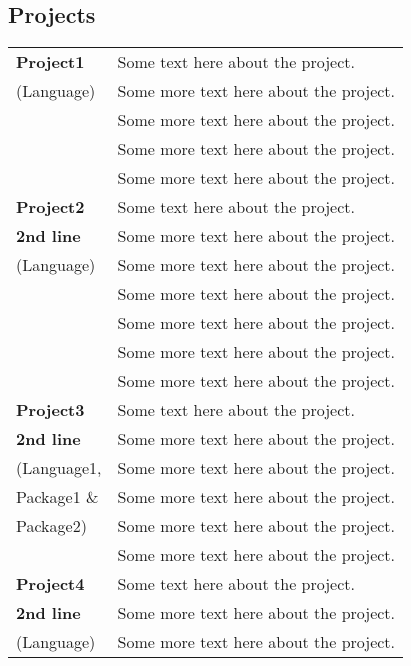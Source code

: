 \documentclass[11pt]{article}
\begin{document}
\begin{multicols}{2}
{{\begin{minipage}[t][\paperheight]{.55\textwidth}
\section{\faSave[regular]{} Projects}
\begin{tabular*}{\textwidth}{@{\hspace{.5em}}l|l@{\hspace{.5em}}}
	\color{jobTitleText}\textbf{Project1} & Some text here about the project.\\
	\color{lightText}(Language) & Some more text here about the project.\\
	\hfill & Some more text here about the project.\\
	\hfill & Some more text here about the project.\\
	\hfill & Some more text here about the project.\vspace{1.5ex}\\
	\color{jobTitleText}\textbf{Project2} & Some text here about the project.\\
	\color{jobTitleText}\textbf{2nd line} & Some more text here about the project.\\
	\color{lightText} (Language) & Some more text here about the project.\\
	\hfill & Some more text here about the project.\\
	\hfill & Some more text here about the project.\\
	\hfill & Some more text here about the project.\\
	\hfill & Some more text here about the project.\vspace{1.5ex}\\
	\color{jobTitleText}\textbf{Project3} & Some text here about the project.\\
	\color{jobTitleText}\textbf{2nd line} & Some more text here about the project.\\
	\color{lightText} (Language1, & Some more text here about the project.\\
	\color{lightText} Package1 \& & Some more text here about the project.\\
	\color{lightText} Package2)	& Some more text here about the project.\\
	\hfill & Some more text here about the project.\vspace{1.5ex}\\
	\color{jobTitleText}\textbf{Project4} & Some text here about the project.\\
	\color{jobTitleText}\textbf{2nd line} & Some more text here about the project.\\
	\color{lightText} (Language) & Some more text here about the project.\\
\end{tabular*}
%
\end{minipage}}}
\end{multicols}
\end{document}
